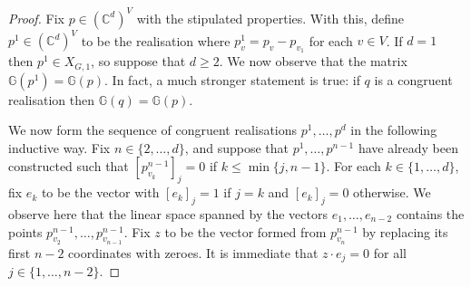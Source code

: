 \begin{proof}
	Fix $p \in (\mathbb{C}^d)^V$ with the stipulated properties.
	With this,
	define $p^1 \in (\mathbb{C}^d)^V$ to be the realisation where $p^1_v = p_v - p_{v_1}$ for each $v \in V$.
	If $d=1$ then $p^1 \in X_{G,1}$,
	so suppose that $d \geq 2$.
	We now observe that the matrix $\mathbb{G}(p^1) = \mathbb{G}(p)$.
	In fact, a much stronger statement is true:
	if $q$ is a congruent realisation then $\mathbb{G}(q) = \mathbb{G}(p)$.
	
	We now form the sequence of congruent realisations $p^1,\ldots,p^d$ in the following inductive way.
	Fix $n \in \{2,\ldots,d\}$,
	and suppose that $p^1,\ldots,p^{n-1}$ have already been constructed such that $[p^{n-1}_{v_k}]_j =0$ if $k \leq \min \{j, n-1\}$.
	For each $k \in \{1,\ldots,d\}$,
	fix $e_k$ to be the vector with $[e_k]_j = 1$ if $j=k$ and $[e_k]_j = 0$ otherwise.
	We observe here that the linear space spanned by the vectors $e_1,\ldots, e_{n-2}$ contains the points $p^{n-1}_{v_2},\ldots, p^{n-1}_{v_{n-1}}$.
	Fix $z$ to be the vector formed from $p^{n-1}_{v_{n}}$ by replacing its first $n-2$ coordinates with zeroes.
	It is immediate that $z \cdot e_j = 0$ for all $j \in \{1 , \ldots, n-2\}$.
	

\end{proof}
